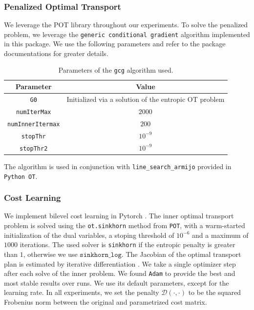 \documentclass{article}
\theoremstyle{definition}
\begin{document}
\subsubsection{Penalized Optimal Transport}
We leverage the POT library \citep{flamary2021pot, flamary2024pot} throughout our experiments. To solve the penalized problem, we leverage the \texttt{generic conditional gradient} algorithm implemented in this package. We use the following parameters and refer to the package documentations for greater details.
\begin{table}[h!]
    \centering
    \begin{tabular}{c|c}
    \toprule
    \textbf{Parameter} & \textbf{Value}  \\
    \midrule
        \texttt{G0} & Initialized via a solution of the entropic OT problem\\
         \texttt{numIterMax}& $2000$ \\
         \texttt{numInnerItermax} & $200$ \\
         \texttt{stopThr}& $10^{-9}$ \\
         \texttt{stopThr2}&$10^{-9}$ \\
    \end{tabular}
    \caption{Parameters of the \texttt{gcg} algorithm used.}
    \label{tab:placeholder}
\end{table}

The algorithm is used in conjunction with \texttt{line\_search\_armijo} provided in \texttt{Python OT}.
\subsubsection{Cost Learning}
We implement bilevel cost learning in Pytorch \citep{Paszke2019}. The inner optimal transport problem is solved using the \texttt{ot.sinkhorn} method from \texttt{POT}, with a warm-started initialization of the dual variables, a stoping threshold of $10^{-6}$ and a maximum of $1000$ iterations. The used solver is \texttt{sinkhorn} if the entropic penalty is greater than $1$, otherwise we use $\texttt{sinkhorn\_log}$. The Jacobian of the optimal transport plan is estimated by iterative differentiation \cite{Pauwels2023}. We take a single optimizer step after each solve of the inner problem. We found \texttt{Adam} \citep{kingma2014adam} to provide the best and most stable results over runs. We use its default parameters, except for the learning rate. In all experiments, we set the penalty $\mathscr{D}(\cdot,\cdot)$ to be the squared Frobenius norm between the original and parametrized cost matrix.
\end{document}
